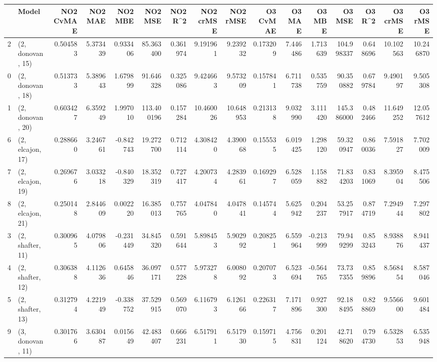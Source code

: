 \begin{tabular}{llrrrrrrrrrrrrrr}
\toprule
{} &             Model &  NO2 CvMAE &   NO2 MAE &   NO2 MBE &     NO2 MSE &   NO2 R\textasciicircum2 &  NO2 crMSE &   NO2 rMSE &  O3 CvMAE &    O3 MAE &    O3 MBE &      O3 MSE &    O3 R\textasciicircum2 &   O3 crMSE &    O3 rMSE \\
\midrule
2  &  (2, donovan, 15) &   0.504583 &  5.373439 &  0.933406 &   85.363400 &  0.361974 &   9.191961 &   9.239232 &  0.173209 &  7.446486 &  1.713639 &  104.998337 &  0.648696 &  10.102563 &  10.246870 \\
0  &  (2, donovan, 18) &   0.513733 &  5.389643 &  1.679899 &   91.646328 &  0.325086 &   9.424663 &   9.573209 &  0.157841 &  6.711738 &  0.535759 &   90.350882 &  0.679784 &   9.490197 &   9.505308 \\
1  &  (2, donovan, 20) &   0.603427 &  6.359249 &  1.997010 &  113.400196 &  0.157284 &  10.460026 &  10.648953 &  0.213138 &  9.032990 &  3.111420 &  145.386000 &  0.482466 &  11.649252 &  12.057612 \\
6  &  (2, elcajon, 17) &   0.288660 &  3.246761 & -0.842743 &   19.272700 &  0.712114 &   4.308420 &   4.390068 &  0.155535 &  6.019425 &  1.298120 &   59.320947 &  0.860036 &   7.591827 &   7.702009 \\
7  &  (2, elcajon, 19) &   0.269676 &  3.033218 & -0.840329 &   18.352319 &  0.727417 &   4.200734 &   4.283961 &  0.169297 &  6.528059 &  1.158882 &   71.834203 &  0.831069 &   8.395904 &   8.475506 \\
8  &  (2, elcajon, 21) &   0.250148 &  2.844609 &  0.002220 &   16.385013 &  0.757765 &   4.047840 &   4.047841 &  0.145744 &  5.625942 &  0.204237 &   53.257917 &  0.874719 &   7.294944 &   7.297802 \\
3  &  (2, shafter, 11) &   0.300965 &  4.079806 & -0.231449 &   34.845320 &  0.591644 &   5.898453 &   5.902992 &  0.208251 &  6.559964 & -0.213999 &   79.949299 &  0.853243 &   8.938876 &   8.941437 \\
4  &  (2, shafter, 12) &   0.306388 &  4.112636 &  0.645846 &   36.097171 &  0.577228 &   5.973278 &   6.008092 &  0.207073 &  6.523694 & -0.564765 &   73.737355 &  0.859896 &   8.568454 &   8.587046 \\
5  &  (2, shafter, 13) &   0.312794 &  4.221949 & -0.338752 &   37.529915 &  0.569070 &   6.116793 &   6.126166 &  0.226317 &  7.171896 &  0.927300 &   92.188495 &  0.828869 &   9.556600 &   9.601484 \\
9  &  (3, donovan, 11) &   0.301766 &  3.630487 &  0.015649 &   42.483407 &  0.666231 &   6.517911 &   6.517930 &  0.159715 &  4.756831 &  0.201124 &   42.718620 &  0.794730 &   6.532853 &   6.535948 \\

\end{tabular}
